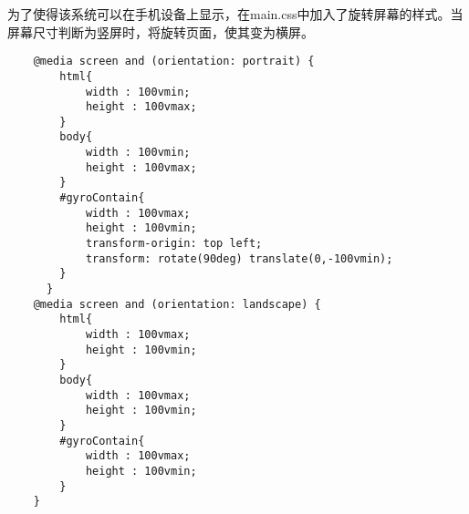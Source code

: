 为了使得该系统可以在手机设备上显示，在main.css中加入了旋转屏幕的样式。当屏幕尺寸判断为竖屏时，将旋转页面，使其变为横屏。

\begin{lstlisting}
    @media screen and (orientation: portrait) {
        html{
            width : 100vmin;
            height : 100vmax;
        }
        body{
            width : 100vmin;
            height : 100vmax;
        }
        #gyroContain{
            width : 100vmax;
            height : 100vmin;
            transform-origin: top left;
            transform: rotate(90deg) translate(0,-100vmin);
        }
      }
    @media screen and (orientation: landscape) {
        html{
            width : 100vmax;
            height : 100vmin;
        }
        body{
            width : 100vmax;
            height : 100vmin;
        }
        #gyroContain{
            width : 100vmax;
            height : 100vmin;
        }
    }
\end{lstlisting}






